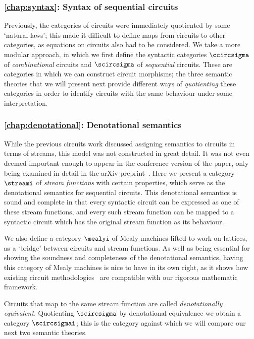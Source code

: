 \subsubsection{\cref{chap:syntax}: Syntax of sequential circuits}

Previously, the categories of circuits were immediately quotiented by some
`natural laws'; this made it difficult to define maps from circuits to other
categories, as equations on circuits also had to be considered.
We take a more modular approach, in which we first define the syntactic
categories \(\ccircsigma\) of \emph{combinational} circuits and \(\scircsigma\)
of \emph{sequential} circuits.
These are categories in which we can construct circuit morphisms; the three
semantic theories that we will present next provide different ways of
\emph{quotienting} these categories in order to identify circuits with the same
behaviour under some interpretation.

\subsubsection{\cref{chap:denotational}: Denotational semantics}

While the previous circuits work discussed assigning semantics to circuits in
terms of streams, this model was not constructed in great detail.
It was not even deemed important enough to appear in the conference version of
the paper, only being examined in detail in the arXiv
preprint~\cite{ghica2017diagrammatica}.
Here we present a category \(\streami\) of \emph{stream functions} with certain
properties, which serve as the denotational semantics for sequential circuits.
This denotational semantics is sound and complete in that every syntactic
circuit can be expressed as one of these stream functions, and every such stream
function can be mapped to a syntactic circuit which has the original stream
function as its behaviour.

We also define a category \(\mealyi\) of Mealy machines lifted to work on
lattices, as a `bridge' between circuits and stream functions.
As well as being essential for showing the soundness and completeness of the
denotational semantics, having this category of Mealy machines is nice to have
in its own right, as it shows how existing circuit
methodologies~\cite{kohavi2009switching} are compatible with our rigorous
mathematic framework.

Circuits that map to the same stream function are called
\emph{denotationally equivalent}.
Quotienting \(\scircsigma\) by denotational equivalence we obtain a category
\(\scircsigmai\); this is the category against which we will compare our next
two semantic theories.


